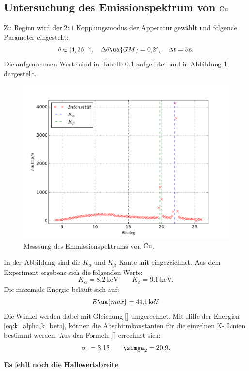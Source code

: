 \subsection{Untersuchung des Emissionspektrum von $\ce{Cu}$}
Zu Beginn wird der $2:1$ Kopplungsmodus der Apperatur gewählt und folgende Parameter eingestellt:
\begin{equation*}
  \theta\in\left[4,26\right]\,\si{\degree},\quad \Delta\theta\ua{GM}=\SI{0.2}{\degree}, \quad \Delta t=\SI{5}{\second}.
\end{equation*}
Die aufgenommen Werte sind in Tabelle \ref{} aufgelistet und in Abbildung \ref{fig: emission_cu} dargestellt.

\begin{figure}
  \centering
  \includegraphics[width=0.8 \textwidth]{../Messdaten/emission_cu.pdf}
  \caption{Messsung des Emmissionspektrums von $\ce{Cu}$.} %
  \label{fig: emission_cu}
\end{figure}
In der Abbildung sind die $K_\alpha$ und $K_\beta$ Kante mit eingezeichnet.
Aus dem Experiment ergebens sich die folgenden Werte:
\begin{equation}
  \label{eq:k_alpha,k_beta}
  K_\alpha=\SI{8.2}{\kilo\eV} \qquad   K_\beta=\SI{9.1}{\kilo\eV}.
\end{equation}
Die maximale Energie beläuft sich auf:
\begin{equation}
  \label{eq: maximale_energie}
  E\ua{max}=\SI{44.1}{\kilo\eV}
\end{equation}
Die Winkel werden dabei mit Gleichung \eqref{} umgerechnet.
Mit Hilfe der Energien \eqref{eq:k_alpha,k_beta}, können die Abschirmkonstanten
für die einzelnen K- Linien bestimmt werden.
Aus den Formeln \eqref{} errechnet sich:
\begin{equation}
   \label{eq:abschirm}
   \sigma_1=3.13 \qquad \simga_2=20.9.
\end{equation}

\textbf{Es fehlt noch die Halbwertsbreite}
